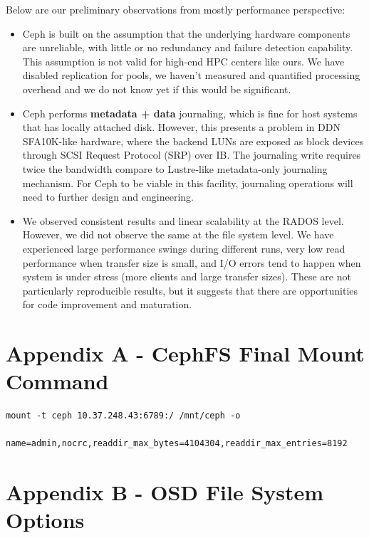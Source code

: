 \documentclass{article}
\begin{document}
Below are our preliminary observations from mostly performance perspective:

\begin{itemize}

  \item Ceph is built on the assumption that the underlying hardware components
are unreliable, with little or no redundancy and failure detection capability.
This assumption is not valid for high-end HPC centers like ours. We have
disabled replication for pools, we haven't measured and quantified
processing overhead and we do not know yet if this would be significant.

  \item Ceph performs \textbf{metadata + data} journaling, which is fine for
host systems that has locally attached disk. However, this presents a problem
in DDN SFA10K-like hardware, where the backend LUNs are exposed as block
devices through SCSI Request Protocol (SRP) over IB. The journaling write
requires twice the bandwidth compare to Lustre-like metadata-only journaling
mechanism. For Ceph to be viable in this facility, journaling operations will
need to further design and engineering.

  \item We observed consistent results and linear scalability at the RADOS
level. However, we did not observe the same at the file system level. We have
experienced large performance swings during different runs, very low read
performance when transfer size is small, and I/O errors tend to happen when
system is under stress (more clients and large transfer sizes). These are not
particularly reproducible results, but it suggests that there are opportunities
for code improvement and maturation.

\end{itemize}

\section*{Appendix A - CephFS Final Mount Command}

\begin{Verbatim}
mount -t ceph 10.37.248.43:6789:/ /mnt/ceph -o
      name=admin,nocrc,readdir_max_bytes=4104304,readdir_max_entries=8192
\end{Verbatim}


\section*{Appendix B - OSD File System Options}
\end{document}
